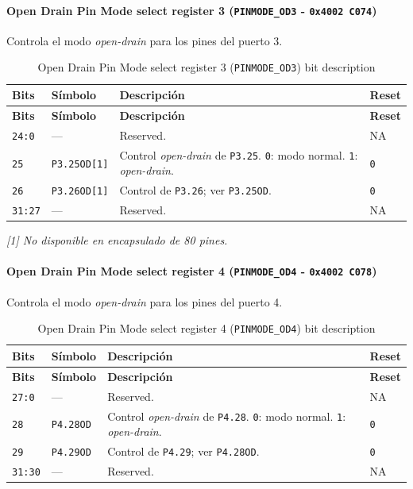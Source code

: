\paragraph{Open Drain Pin Mode select register 3 (\texttt{PINMODE\_OD3} - \texttt{0x4002 C074})}
Controla el modo \textit{open-drain} para los pines del puerto 3.

\begin{longtable}{|>{\raggedright\arraybackslash}p{}|>{\raggedright\arraybackslash}p{}|>{\raggedright\arraybackslash}p{}|>{\centering\arraybackslash}p{}|}
\caption{Open Drain Pin Mode select register 3 (\texttt{PINMODE\_OD3}) bit description}\\
\hline
\textbf{Bits} & \textbf{Símbolo} & \textbf{Descripción} & \textbf{Reset} \\
\hline
\endfirsthead
\hline
\textbf{Bits} & \textbf{Símbolo} & \textbf{Descripción} & \textbf{Reset} \\
\hline
\endhead
\texttt{24:0} & --- & Reserved. & NA \\
\hline
\texttt{25} & \texttt{P3.25OD[1]} & Control \textit{open-drain} de \texttt{P3.25}. \texttt{0}: modo normal. \texttt{1}: \textit{open-drain}. & \texttt{0} \\
\hline
\texttt{26} & \texttt{P3.26OD[1]} & Control de \texttt{P3.26}; ver \texttt{P3.25OD}. & \texttt{0} \\
\hline
\texttt{31:27} & --- & Reserved. & NA \\
\hline
\end{longtable}
\noindent\textit{[1] No disponible en encapsulado de 80 pines.}

\paragraph{Open Drain Pin Mode select register 4 (\texttt{PINMODE\_OD4} - \texttt{0x4002 C078})}
Controla el modo \textit{open-drain} para los pines del puerto 4.

\begin{longtable}{|>{\raggedright\arraybackslash}p{}|>{\raggedright\arraybackslash}p{}|>{\raggedright\arraybackslash}p{}|>{\centering\arraybackslash}p{}|}
\caption{Open Drain Pin Mode select register 4 (\texttt{PINMODE\_OD4}) bit description}\\
\hline
\textbf{Bits} & \textbf{Símbolo} & \textbf{Descripción} & \textbf{Reset} \\
\hline
\endfirsthead
\hline
\textbf{Bits} & \textbf{Símbolo} & \textbf{Descripción} & \textbf{Reset} \\
\hline
\endhead
\texttt{27:0} & --- & Reserved. & NA \\
\hline
\texttt{28} & \texttt{P4.28OD} & Control \textit{open-drain} de \texttt{P4.28}. \texttt{0}: modo normal. \texttt{1}: \textit{open-drain}. & \texttt{0} \\
\hline
\texttt{29} & \texttt{P4.29OD} & Control de \texttt{P4.29}; ver \texttt{P4.28OD}. & \texttt{0} \\
\hline
\texttt{31:30} & --- & Reserved. & NA \\
\hline
\end{longtable}

